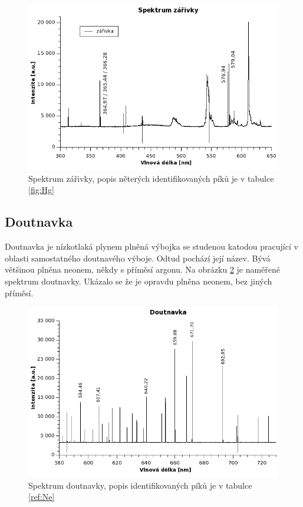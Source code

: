 \documentclass[12pt]{article}
\begin{document}
\begin{figure}[h!]
  \centering
  \includegraphics[width=13cm]{img/zarivka.png}
  \caption{Spektrum zářivky, popis něterých identifikovaných píků je v tabulce \ref{fig:Hg}}
  \label{fig:zarivka} 
\end{figure}


\subsection{Doutnavka}
Doutnavka je nízkotlaká plynem plněná výbojka se studenou katodou pracující v oblasti samostatného doutnavého výboje. Odtud pochází její název. Bývá většinou plněna neonem, někdy s příměsí argonu. Na obrázku \ref{fig:doutnavka} je naměřené spektrum doutnavky. Ukázalo se že je opravdu plněna neonem, bez jiných příměsí.

\begin{figure}[h!]
  \centering
  \includegraphics[width=13cm]{img/doutnavka.png}
  \caption{Spektrum doutnavky, popis identifikovaných píků je v tabulce \ref{ref:Ne}}
  \label{fig:doutnavka} 
\end{figure}
\end{document}
